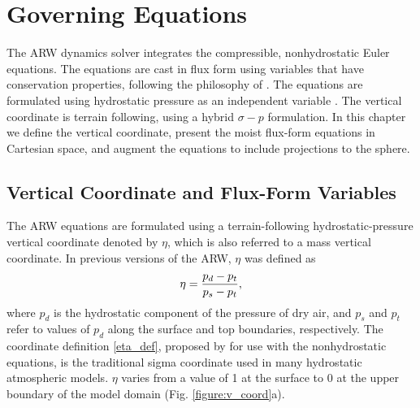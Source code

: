\chapter{Governing Equations}
\label{equation_chap}

The ARW dynamics solver integrates the compressible, nonhydrostatic
Euler equations.  The equations are cast in flux form using variables
that have conservation properties, following the philosophy of \citet{ooyama90}.
The equations are formulated using hydrostatic pressure as an independent variable
\citep{laprise92}. The vertical coordinate is terrain following, using a hybrid $\sigma-p$ formulation. In this chapter we define the vertical coordinate, present the moist flux-form equations in Cartesian
space, and augment the equations to include projections to the sphere.

\section{Vertical Coordinate and Flux-Form Variables}

%
%
The ARW equations are formulated using a terrain-following
hydrostatic-pressure vertical coordinate denoted by $\eta$, which is also referred to a mass 
vertical coordinate. In previous versions of the ARW, $\eta$ was defined as
%
\begin{equation}
\eta = {p_d-p_{t}\over p_{s}-p_{t}},
\label{eta_def}
\end{equation}
where $p_d$ is the hydrostatic component of the pressure of dry air, and
$p_{s}$ and $p_{t}$ refer to values of $p_d$ along the surface and top
boundaries, respectively. The coordinate definition \eqref{eta_def},
proposed by \citet{laprise92} for use with the nonhydrostatic equations, 
is the traditional sigma coordinate used
in many hydrostatic atmospheric models.  $\eta$ varies from a value of 1
at the surface to 0 at the upper boundary of the model domain (Fig. \ref{figure:v_coord}a).

